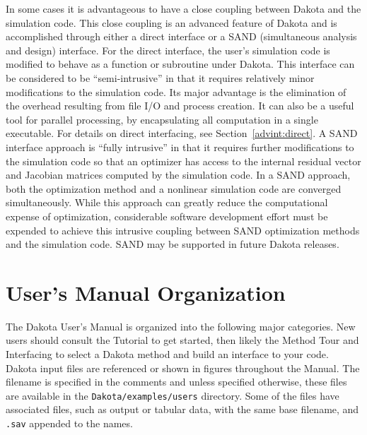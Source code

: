 In some cases it is advantageous to have a close coupling between
Dakota and the simulation code. This close coupling is an advanced
feature of Dakota and is accomplished through either a direct
interface or a SAND (simultaneous analysis and design) interface. For
the direct interface, the user's simulation code is modified to behave
as a function or subroutine under Dakota. This interface can be
considered to be ``semi-intrusive'' in that it requires relatively
minor modifications to the simulation code. Its major advantage is the
elimination of the overhead resulting from file I/O and process
creation. It can also be a useful tool for parallel processing, by
encapsulating all computation in a single executable.  For details on
direct interfacing, see Section~\ref{advint:direct}. A SAND interface
approach is ``fully intrusive'' in that it requires further
modifications to the simulation code so that an optimizer has access
to the internal residual vector and Jacobian matrices computed by the
simulation code. In a SAND approach, both the optimization method and
a nonlinear simulation code are converged simultaneously. While this
approach can greatly reduce the computational expense of optimization,
considerable software development effort must be expended to achieve
this intrusive coupling between SAND optimization methods and the
simulation code.  SAND may be supported in future Dakota releases.


\section{User's Manual Organization}\label{intro:organization}

The Dakota User's Manual is organized into the following major
categories.  New users should consult the Tutorial to get started,
then likely the Method Tour and Interfacing to select a Dakota method
and build an interface to your code. Dakota input files are referenced or shown
in figures throughout the Manual. The filename is specified in the comments
and unless specified otherwise, these
files are available in the {\tt Dakota/examples/users} directory. Some
of the files have associated files, such as output or tabular data,
with the same base filename, and {\tt .sav} appended to the names.

